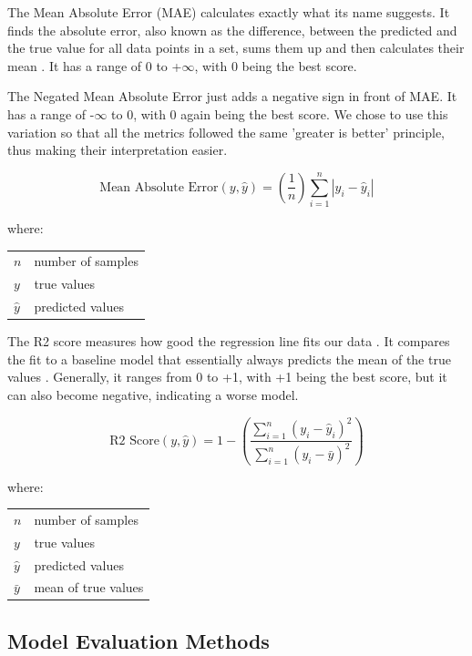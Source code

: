 \newenvironment{conditions}
  {\par\vspace{\abovedisplayskip}\noindent\begin{tabular}{>{$}l<{$} @{${}={}$} l}}
  {\end{tabular}\par\vspace{\belowdisplayskip}}
  
The Mean Absolute Error (MAE) calculates exactly what its name suggests. It finds the absolute error, also known as the difference, between the predicted and the true value for all data points in a set, sums them up and then calculates their mean \citep{MAE}. It has a range of 0 to +$\infty$, with 0 being the best score.

The Negated Mean Absolute Error just adds a negative sign in front of MAE. It has a range of -$\infty$ to 0, with 0 again being the best score. We chose to use this variation so that all the metrics followed the same 'greater is better' principle, thus making their interpretation easier.

$$\text{Mean Absolute Error} (y,\hat{y}) = (\frac{1}{n})\sum_{i=1}^{n}\left | y_{i} - \hat{y}_{i} \right | $$

where: 
\begin{conditions}
n & number of samples\\
y & true values \\
\hat{y} & predicted values
\end{conditions}

The R2 score measures how good the regression line fits our data \citep{R2}. It compares the fit to a baseline model that essentially always predicts the mean of the true values \citep{R2_2}. Generally, it ranges from 0 to +1, with +1 being the best score, but it can also become negative, indicating a worse model.

$$\text{R2 Score} (y,\hat{y}) = 1 - (\frac{\sum_{i=1}^{n}(y_{i} - \hat{y}_{i})^2}{\sum_{i=1}^{n}(y_{i} - \bar{y})^2})$$

where: 
\begin{conditions}
n & number of samples\\
y & true values \\
\hat{y} & predicted values \\
\bar{y} & mean of true values
\end{conditions}

\subsection{Model Evaluation Methods}

